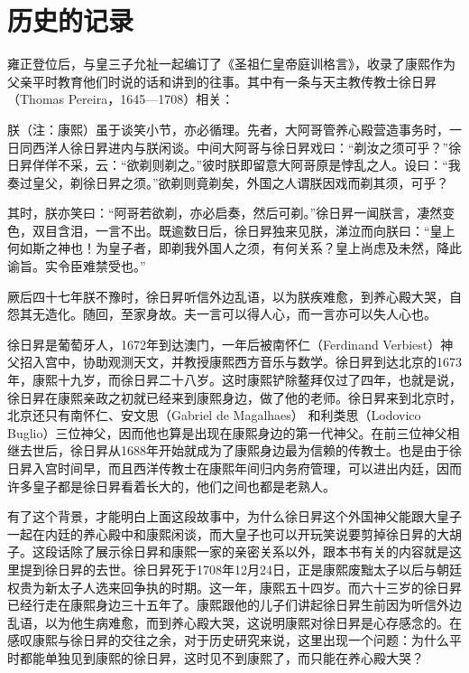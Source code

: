 \chapter{历史的记录}

雍正登位后，与皇三子允祉一起编订了《圣祖仁皇帝庭训格言》，收录了康熙作为父亲平时教育他们时说的话和讲到的往事。其中有一条与天主教传教士徐日昇（Thomas Pereira，1645—1708）相关：



\begin{bookquote}朕（注：康熙）虽于谈笑小节，亦必循理。先者，大阿哥管养心殿营造事务时，一日同西洋人徐日昇进内与朕闲谈。中间大阿哥与徐日昇戏曰：“剃汝之须可乎？”徐日昇佯佯不采，云：“欲剃则剃之。”彼时朕即留意大阿哥原是悖乱之人。设曰：“我奏过皇父，剃徐日昇之须。”欲剃则竟剃矣，外国之人谓朕因戏而剃其须，可乎？\end{bookquote}


\begin{bookquote}其时，朕亦笑曰：“阿哥若欲剃，亦必启奏，然后可剃。”徐日昇一闻朕言，凄然变色，双目含泪，一言不出。既逾数日后，徐日昇独来见朕，涕泣而向朕曰：“皇上何如斯之神也！为皇子者，即剃我外国人之须，有何关系？皇上尚虑及未然，降此谕旨。实令臣难禁受也。”\end{bookquote}


\begin{bookquote}厥后四十七年朕不豫时，徐日昇听信外边乱语，以为朕疾难愈，到养心殿大哭，自怨其无造化。随回，至家身故。夫一言可以得人心，而一言亦可以失人心也。\end{bookquote}


徐日昇是葡萄牙人，1672年到达澳门，一年后被南怀仁（Ferdinand Verbiest）神父招入宫中，协助观测天文，并教授康熙西方音乐与数学。徐日昇到达北京的1673年，康熙十九岁，而徐日昇二十八岁。这时康熙铲除鳌拜仅过了四年，也就是说，徐日昇在康熙亲政之初就已经来到康熙身边，做了他的老师。徐日昇来到北京时，北京还只有南怀仁、安文思（Gabriel de Magalhaes） 和利类思（Lodovico Buglio）三位神父，因而他也算是出现在康熙身边的第一代神父。在前三位神父相继去世后，徐日昇从1688年开始就成为了康熙身边最为信赖的传教士。也是由于徐日昇入宫时间早，而且西洋传教士在康熙年间归内务府管理，可以进出内廷，因而许多皇子都是徐日昇看着长大的，他们之间也都是老熟人。



有了这个背景，才能明白上面这段故事中，为什么徐日昇这个外国神父能跟大皇子一起在内廷的养心殿中和康熙闲谈，而大皇子也可以开玩笑说要剪掉徐日昇的大胡子。这段话除了展示徐日昇和康熙一家的亲密关系以外，跟本书有关的内容就是这里提到徐日昇的去世。徐日昇死于1708年12月24日，正是康熙废黜太子以后与朝廷权贵为新太子人选来回争执的时期。这一年，康熙五十四岁。而六十三岁的徐日昇已经行走在康熙身边三十五年了。康熙跟他的儿子们讲起徐日昇生前因为听信外边乱语，以为他生病难愈，而到养心殿大哭，这说明康熙对徐日昇是心存感念的。在感叹康熙与徐日昇的交往之余，对于历史研究来说，这里出现一个问题：为什么平时都能单独见到康熙的徐日昇，这时见不到康熙了，而只能在养心殿大哭？


